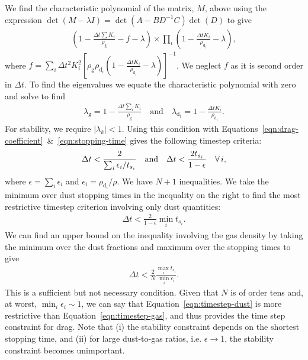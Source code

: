 \documentclass[fleqn,usenatbib]{mnras}
\newcommand{\g}{\mathrm{g}}
\newcommand{\dd}{\mathrm{d}}
\begin{document}
%
We find the characteristic polynomial of the matrix, \(M\), above using the
expression \(\det(M - \lambda I) = \det(A - B D^{-1} C) \det(D)\) to give
%
\begin{align}
   \left(1 - \frac{\Delta t \sum K_i}{\rho_{\g}} - f - \lambda\right)
   \times \prod_i \left(1 - \frac{\Delta t K_i}{\rho_{\dd_i}} - \lambda\right),
\end{align}
%
where \(f = \sum_i \Delta t^2 K_i^2 \left[\rho_{\g} \rho_{\dd_i} \left( 1 -
\frac{\Delta t K_i}{\rho_{\dd_i}} - \lambda \right) \right]^{-1}\). We neglect
\(f\) as it is second order in \(\Delta t\). To find the eigenvalues we equate
the characteristic polynomial with zero and solve to find
%
\begin{align}
   \lambda_{\g} = 1 - \frac{\Delta t \sum_i K_i}{\rho_{\g}} \quad \mathrm{and} \quad
   \lambda_{\dd_i} = 1 - \frac{\Delta t K_i}{\rho_{\dd_i}}.
\end{align}
%
For stability, we require \(|\lambda_k| < 1\). Using this condition with
Equations~\ref{eqn:drag-coefficient}~\&~\ref{eqn:stopping-time} gives the
following timestep criteria:
%
\begin{align}
   \Delta t < \frac{2}{\sum_i \epsilon_i / t_{s_i}} \quad {\rm and} \quad
   \Delta t < \frac{2 t_{s_i}}{1 - \epsilon} \quad \forall \, i,
\end{align}
%
where \(\epsilon = \sum_i \epsilon_i\) and \(\epsilon_i = \rho_{\dd_i} / \rho\).
We have \(N + 1\) inequalities. We take the minimum over dust stopping times in
the inequality on the right to find the most restrictive timestep criterion
involving only dust quantities:
%
\begin{align}
   \label{eqn:timestep-dust}
   \Delta t < \frac{2}{1 - \epsilon} \min_i t_{s_i}.
\end{align}
%
We can find an upper bound on the inequality involving the gas density by taking
the minimum over the dust fractions and maximum over the stopping times to give
%
\begin{align}
   \label{eqn:timestep-gas}
   \Delta t < \frac{2}{N} \frac{\max_i t_{s_i}}{\min_i \epsilon_i}.
\end{align}
%
This is a sufficient but not necessary condition. Given that \(N\) is of order
tens and, at worst, \(\min_i \epsilon_i \sim 1\), we can say that
Equation~\ref{eqn:timestep-dust} is more restrictive than
Equation~\ref{eqn:timestep-gas}, and thus provides the time step constraint for
drag. Note that (i) the stability constraint depends on the shortest stopping
time, and (ii) for large dust-to-gas ratios, i.e. \(\epsilon \rightarrow 1\),
the stability constraint becomes unimportant.
\end{document}
